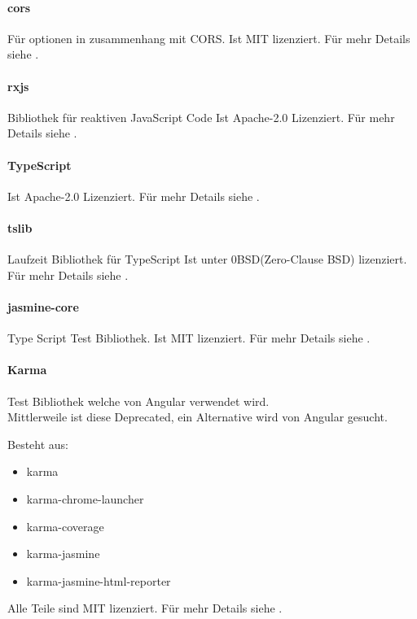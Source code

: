 \paragraph{cors}
Für optionen in zusammenhang mit CORS.
Ist MIT lizenziert.
Für mehr Details siehe .

\paragraph{rxjs}
Bibliothek für reaktiven JavaScript Code
Ist Apache-2.0 Lizenziert.
Für mehr Details siehe .

\paragraph{TypeScript}
Ist Apache-2.0 Lizenziert.
Für mehr Details siehe .

\paragraph{tslib}
Laufzeit Bibliothek für TypeScript
Ist unter 0BSD(Zero-Clause BSD) lizenziert.
Für mehr Details siehe .


\paragraph{jasmine-core}
Type Script Test Bibliothek.
Ist MIT lizenziert.
Für mehr Details siehe .

\paragraph{Karma}
Test Bibliothek welche von Angular verwendet wird.\\
Mittlerweile ist diese Deprecated, ein Alternative wird von Angular gesucht.

Besteht aus:
\begin{itemize}
    \item karma
    \item karma-chrome-launcher
    \item karma-coverage
    \item karma-jasmine
    \item karma-jasmine-html-reporter
\end{itemize}

Alle Teile sind MIT lizenziert.
Für mehr Details siehe .


